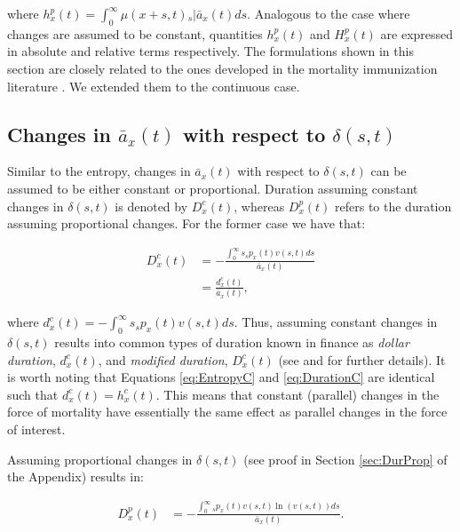 \documentclass[12pt]{article}
\begin{document}
where ${h}^{p}_{x}(t)=\int_0^\infty \mu(x+s,t)   {}_s|\bar{a}_x(t) ds$. Analogous to the case where changes are assumed to be constant, quantities ${h}^{p}_{x}(t)$ and ${H}^{p}_{x}(t)$ are expressed in absolute and relative terms respectively. The formulations shown in this section are closely related to the ones developed in the mortality immunization literature \citep{Tsai2013a,Lin2020}. We extended them to the continuous case.

 
 

\subsection{Changes in $\bar{a}_x(t)$ with respect to $\delta(s,t)$}

 Similar to the entropy, changes in $\bar{a}_x(t)$ with respect to $\delta(s,t)$ can be assumed to be either constant or proportional. Duration assuming constant changes in $\delta(s,t)$ is denoted by ${D}^{c}_{x}(t)$, whereas ${D}^{p}_{x}(t)$ refers to the duration assuming proportional changes. For the former case we have that:



\begin{equation}\label{eq:DurationC}
\begin{split}
{D}^{c}_x(t)&= -\frac{\int_0^\infty s {}_sp_x(t) {v}(s,t)ds}{\bar{a}_x(t)} \\
&= \frac{{d}^{c}_x(t)}{\bar{a}_x(t)},
\end{split}
\end{equation}

where ${d}^{c}_x(t)=-\int_0^\infty s {}_sp_x(t) {v}(s,t)ds$. Thus, assuming constant changes in $\delta(s,t)$ results into common types of duration known in finance as \textit{dollar duration}, ${d}^{c}_x(t)$, and \textit{modified duration}, ${D}^{c}_x(t)$ (see \citet{Milevsky2012} and \citet{Tsai2013a} for further details). It is worth noting that Equations \ref{eq:EntropyC} and \ref{eq:DurationC} are identical such that ${d}^{c}_x(t)={h}^{c}_{x}(t)$. This means that constant (parallel) changes in the force of mortality have essentially the same effect as parallel changes in the force of interest.


Assuming proportional changes in $\delta(s,t)$ (see proof in Section \ref{sec:DurProp} of the Appendix) results in: 


\begin{equation}\label{eq:DurationP}
\begin{split}
{D}^{p}_{x}(t) &= -\frac{\int_0^\infty {}_sp_x(t) v(s,t) \ln(v(s,t))ds}{\bar{a}_x(t)}. \\
\end{split}
\end{equation}
\end{document}
